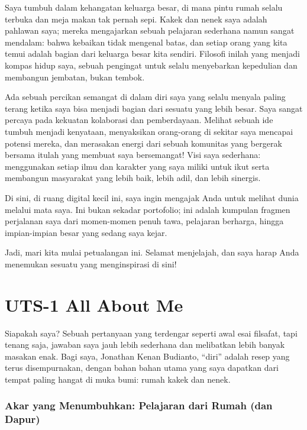 \documentclass[
  letterpaper,
  DIV=11,
  numbers=noendperiod]{scrreprt}
\begin{document}
Saya tumbuh dalam kehangatan keluarga besar, di mana pintu rumah selalu
terbuka dan meja makan tak pernah sepi. Kakek dan nenek saya adalah
pahlawan saya; mereka mengajarkan sebuah pelajaran sederhana namun
sangat mendalam: bahwa kebaikan tidak mengenal batas, dan setiap orang
yang kita temui adalah bagian dari keluarga besar kita sendiri. Filosofi
inilah yang menjadi kompas hidup saya, sebuah pengingat untuk selalu
menyebarkan kepedulian dan membangun jembatan, bukan tembok.

Ada sebuah percikan semangat di dalam diri saya yang selalu menyala
paling terang ketika saya bisa menjadi bagian dari sesuatu yang lebih
besar. Saya sangat percaya pada kekuatan kolaborasi dan pemberdayaan.
Melihat sebuah ide tumbuh menjadi kenyataan, menyaksikan orang-orang di
sekitar saya mencapai potensi mereka, dan merasakan energi dari sebuah
komunitas yang bergerak bersama itulah yang membuat saya bersemangat!
Visi saya sederhana: menggunakan setiap ilmu dan karakter yang saya
miliki untuk ikut serta membangun masyarakat yang lebih baik, lebih
adil, dan lebih sinergis.

Di sini, di ruang digital kecil ini, saya ingin mengajak Anda untuk
melihat dunia melalui mata saya. Ini bukan sekadar portofolio; ini
adalah kumpulan fragmen perjalanan saya dari momen-momen penuh tawa,
pelajaran berharga, hingga impian-impian besar yang sedang saya kejar.

Jadi, mari kita mulai petualangan ini. Selamat menjelajah, dan saya
harap Anda menemukan sesuatu yang menginspirasi di sini!


\chapter{UTS-1 All About Me}\label{uts-1-all-about-me}

Siapakah saya? Sebuah pertanyaan yang terdengar seperti awal esai
filsafat, tapi tenang saja, jawaban saya jauh lebih sederhana dan
melibatkan lebih banyak masakan enak. Bagi saya, Jonathan Kenan
Budianto, ``diri'' adalah resep yang terus disempurnakan, dengan bahan
bahan utama yang saya dapatkan dari tempat paling hangat di muka bumi:
rumah kakek dan nenek.

\subsection{Akar yang Menumbuhkan: Pelajaran dari Rumah (dan
Dapur)}\label{akar-yang-menumbuhkan-pelajaran-dari-rumah-dan-dapur}
\end{document}
